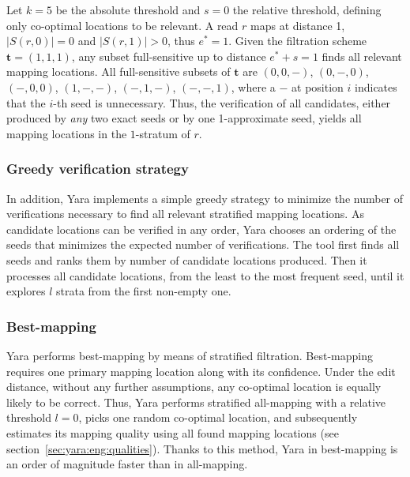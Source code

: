 \begin{example}
Let $k=5$ be the absolute threshold and $s=0$ the relative threshold, defining only co-optimal locations to be relevant.
A read $r$ maps at distance 1, \ie $|S(r,0)| = 0$ and $|S(r,1)| > 0$, thus $e^* = 1$.
Given the filtration scheme $\mathbf{t}=(1,1,1)$, any subset full-sensitive up to distance $e^*+s = 1$ finds all relevant mapping locations.
All full-sensitive subsets of $\mathbf{t}$ are $(0,0,-)$, $(0,-,0)$, $(-,0,0)$, $(1,-,-)$, $(-,1,-)$, $(-,-,1)$, where a $-$ at position $i$ indicates that the $i$-th seed is unnecessary.
Thus, the verification of all candidates, either produced by \emph{any} two exact seeds or by one 1-approximate seed, yields all mapping locations in the $1$-stratum of $r$.
\end{example}

\subsubsection{Greedy verification strategy}
In addition, Yara implements a simple greedy strategy to minimize the number of verifications necessary to find all relevant stratified mapping locations.
As candidate locations can be verified in any order, Yara chooses an ordering of the seeds that minimizes the expected number of verifications.
The tool first finds all seeds and ranks them by number of candidate locations produced.
Then it processes all candidate locations, from the least to the most frequent seed, until it explores $l$ strata from the first non-empty one. %

\subsubsection{Best-mapping}
Yara performs best-mapping by means of stratified filtration.
Best-mapping requires one primary mapping location along with its confidence.
Under the edit distance, without any further assumptions, any co-optimal location is equally likely to be correct.
Thus, Yara performs stratified all-mapping with a relative threshold $l=0$, picks one random co-optimal location, and subsequently estimates its mapping quality using all found mapping locations (see section~\ref{sec:yara:eng:qualities}).
Thanks to this method, Yara in best-mapping is an order of magnitude faster than in all-mapping.


